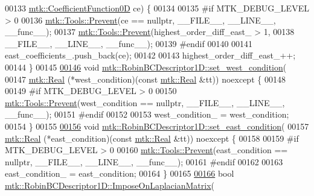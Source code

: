 \begin{DoxyCode}
00133     \hyperlink{group__c07-mim__ops_ga04276745b4d511f0f3c636d6e0df7c2d}{mtk::CoefficientFunction0D} ce) \{
00134 
00135 \textcolor{preprocessor}{  #if MTK\_DEBUG\_LEVEL > 0}
00136   \hyperlink{classmtk_1_1Tools_a332324c6f25e66be9dff48c5987a3b9f}{mtk::Tools::Prevent}(ce == \textcolor{keyword}{nullptr}, \_\_FILE\_\_, \_\_LINE\_\_, \_\_func\_\_);
00137   \hyperlink{classmtk_1_1Tools_a332324c6f25e66be9dff48c5987a3b9f}{mtk::Tools::Prevent}(highest\_order\_diff\_east\_ > 1,
00138                       \_\_FILE\_\_, \_\_LINE\_\_, \_\_func\_\_);
00139 \textcolor{preprocessor}{  #endif}
00140 
00141   east\_coefficients\_.push\_back(ce);
00142 
00143   highest\_order\_diff\_east\_++;
00144 \}
00145 
\hypertarget{mtk__robin__bc__descriptor__1d_8cc_source_l00146}{}\hyperlink{classmtk_1_1RobinBCDescriptor1D_a06bfaf0126d528247c3c76fdd19f4b85}{00146} \textcolor{keywordtype}{void} \hyperlink{classmtk_1_1RobinBCDescriptor1D_a06bfaf0126d528247c3c76fdd19f4b85}{mtk::RobinBCDescriptor1D::set\_west\_condition}(
00147     \hyperlink{group__c01-roots_gac080bbbf5cbb5502c9f00405f894857d}{mtk::Real} (*west\_condition)(\textcolor{keyword}{const} \hyperlink{group__c01-roots_gac080bbbf5cbb5502c9f00405f894857d}{mtk::Real} &tt)) noexcept \{
00148 
00149 \textcolor{preprocessor}{  #if MTK\_DEBUG\_LEVEL > 0}
00150   \hyperlink{classmtk_1_1Tools_a332324c6f25e66be9dff48c5987a3b9f}{mtk::Tools::Prevent}(west\_condition == \textcolor{keyword}{nullptr}, \_\_FILE\_\_, \_\_LINE\_\_, \_\_func\_\_);
00151 \textcolor{preprocessor}{  #endif}
00152 
00153   west\_condition\_ = west\_condition;
00154 \}
00155 
\hypertarget{mtk__robin__bc__descriptor__1d_8cc_source_l00156}{}\hyperlink{classmtk_1_1RobinBCDescriptor1D_a4edc92eeaaaa3f1e7f2cedfea3d35681}{00156} \textcolor{keywordtype}{void} \hyperlink{classmtk_1_1RobinBCDescriptor1D_a4edc92eeaaaa3f1e7f2cedfea3d35681}{mtk::RobinBCDescriptor1D::set\_east\_condition}(
00157     \hyperlink{group__c01-roots_gac080bbbf5cbb5502c9f00405f894857d}{mtk::Real} (*east\_condition)(\textcolor{keyword}{const} \hyperlink{group__c01-roots_gac080bbbf5cbb5502c9f00405f894857d}{mtk::Real} &tt)) noexcept \{
00158 
00159 \textcolor{preprocessor}{  #if MTK\_DEBUG\_LEVEL > 0}
00160   \hyperlink{classmtk_1_1Tools_a332324c6f25e66be9dff48c5987a3b9f}{mtk::Tools::Prevent}(east\_condition == \textcolor{keyword}{nullptr}, \_\_FILE\_\_, \_\_LINE\_\_, \_\_func\_\_);
00161 \textcolor{preprocessor}{  #endif}
00162 
00163   east\_condition\_ = east\_condition;
00164 \}
00165 
\hypertarget{mtk__robin__bc__descriptor__1d_8cc_source_l00166}{}\hyperlink{classmtk_1_1RobinBCDescriptor1D_ab8446428df923c27f388a85bd3f2c6d4}{00166} \textcolor{keywordtype}{bool} \hyperlink{classmtk_1_1RobinBCDescriptor1D_ab8446428df923c27f388a85bd3f2c6d4}{mtk::RobinBCDescriptor1D::ImposeOnLaplacianMatrix}(

\end{DoxyCode}
